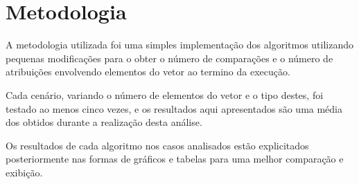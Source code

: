 \chapter{Metodologia}
\label{chap:metodologia}

A metodologia utilizada foi uma simples implementação dos algoritmos utilizando pequenas modificações para o obter o número de comparações e o número de atribuições envolvendo elementos do vetor ao termino da execução.

Cada cenário, variando o número de elementos do vetor e o tipo destes, foi testado ao menos cinco vezes, e os resultados aqui apresentados são uma média dos obtidos durante a realização desta análise.

Os resultados de cada algoritmo nos casos analisados estão explicitados posteriormente nas formas de gráficos e tabelas para uma melhor comparação e exibição.